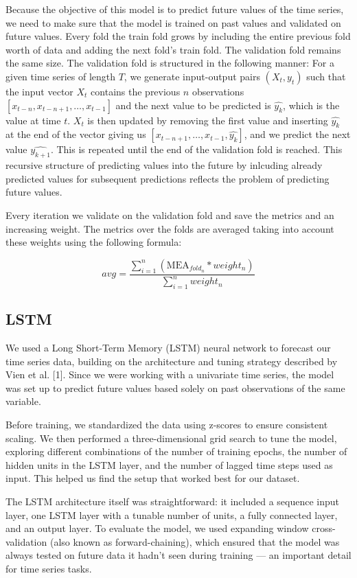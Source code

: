 \documentclass[conference]{IEEEtran}
\begin{document}
Because the objective of this model is to predict future values of the time series, we need to
make sure that the model is trained on past values and validated on future values. Every fold the 
train fold grows by including the entire previous fold worth of data and adding the next fold's train fold.  
The validation fold remains the same size. The validation fold is structured in the following manner:
For a given time series of length $T$, we generate input-output pairs $(X_t,y_t)$ such that the 
input vector $X_t$ contains the previous $n$ observations $[x_{t-n}, x_{t-n+1}, \ldots, x_{t-1}]$ 
and the next value to be predicted is $\hat{y_k}$, which is the value at time $t$. $X_t$ is then 
updated by removing the first value and inserting $\hat{y_k}$ at the end of the vector giving us
$[x_{t-n+1}, \ldots, x_{t-1}, \hat{y_k}]$, and we predict the next value $\hat{y_{k+1}}$. This is 
repeated until the end of the validation fold is reached. This recursive structure of predicting 
values into the future by inlcuding already predicted values for subsequent predictions reflects 
the problem of predicting future values. %

Every iteration we validate on the validation fold and save the metrics and an increasing weight. 
The metrics over the folds are averaged taking into account these weights using the following
formula:

$$avg = \frac{\sum_{i=1}^{n}(\text{MEA}_{fold_n} * weight_n)}{\sum_{i=1}^n weight_n}$$

\subsection{LSTM}
We used a Long Short-Term Memory (LSTM) neural network to forecast our time series data, building on 
the architecture and tuning strategy described by Vien et al. [1]. Since we were working with a univariate 
time series, the model was set up to predict future values based solely on past observations of the same 
variable.

Before training, we standardized the data using z-scores to ensure consistent scaling. We then performed 
a three-dimensional grid search to tune the model, exploring different combinations of the number of 
training epochs, the number of hidden units in the LSTM layer, and the number of lagged time steps used as 
input. This helped us find the setup that worked best for our dataset.

The LSTM architecture itself was straightforward: it included a sequence input layer, one LSTM layer with 
a tunable number of units, a fully connected layer, and an output layer. To evaluate the model, we used 
expanding window cross-validation (also known as forward-chaining), which ensured that the model was 
always tested on future data it hadn’t seen during training — an important detail for time series tasks.
\end{document}
